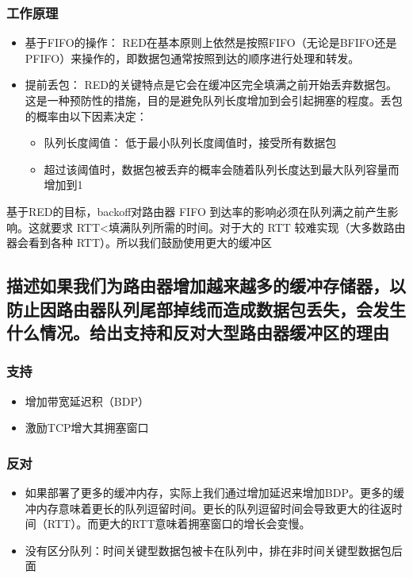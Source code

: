 \subsubsection{工作原理}

\begin{itemize}
	\item 基于FIFO的操作： RED在基本原则上依然是按照FIFO（无论是BFIFO还是PFIFO）来操作的，即数据包通常按照到达的顺序进行处理和转发。
	\item 提前丢包： RED的关键特点是它会在缓冲区完全填满之前开始丢弃数据包。这是一种预防性的措施，目的是避免队列长度增加到会引起拥塞的程度。丢包的概率由以下因素决定：
		\begin{itemize}
		\item 队列长度阈值： 低于最小队列长度阈值时，接受所有数据包
		\item 超过该阈值时，数据包被丢弃的概率会随着队列长度达到最大队列容量而增加到1
		\end{itemize}
\end{itemize}

基于RED的目标，backoff对路由器 FIFO 到达率的影响必须在队列满之前产生影响。这就要求 RTT<填满队列所需的时间。对于大的 RTT 较难实现（大多数路由器会看到各种 RTT）。所以我们鼓励使用更大的缓冲区


\subsection{描述如果我们为路由器增加越来越多的缓冲存储器，以防止因路由器队列尾部掉线而造成数据包丢失，会发生什么情况。给出支持和反对大型路由器缓冲区的理由}

\subsubsection{支持}

\begin{itemize}
	\item 增加带宽延迟积（BDP）
	\item 激励TCP增大其拥塞窗口
\end{itemize}

\subsubsection{反对}

\begin{itemize}
	\item 如果部署了更多的缓冲内存，实际上我们通过增加延迟来增加BDP。更多的缓冲内存意味着更长的队列逗留时间。更长的队列逗留时间会导致更大的往返时间（RTT）。而更大的RTT意味着拥塞窗口的增长会变慢。
	\item 没有区分队列：时间关键型数据包被卡在队列中，排在非时间关键型数据包后面
\end{itemize}

